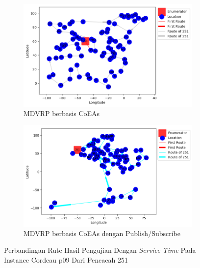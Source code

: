 \begin{figure}[H]
	\centering
	\begin{subfigure}[t]{\textwidth}
		\centering
		\includegraphics[width=\textwidth]{Resources/Images/cordeau_p09_tw/cordeau_p09_tw_251_coes}
		\caption{MDVRP berbasis CoEAs}
		\label{fig:cordeau_p09_tw_251_coes}
	\end{subfigure}
	\begin{subfigure}[t]{\textwidth}
		\centering
		\includegraphics[width=\textwidth]{Resources/Images/cordeau_p09_tw/cordeau_p09_tw_251_pubsub_coes}
		\caption{MDVRP berbasis CoEAs dengan Publish/Subscribe}
		\label{fig:cordeau_p09_tw_251_pubsub_coes}
	\end{subfigure}
	\caption{Perbandingan Rute Hasil Pengujian Dengan \textit{Service Time} Pada Instance Cordeau p09 Dari Pencacah 251}
	\label{fig:cordeau_p09_tw_251}
\end{figure}


